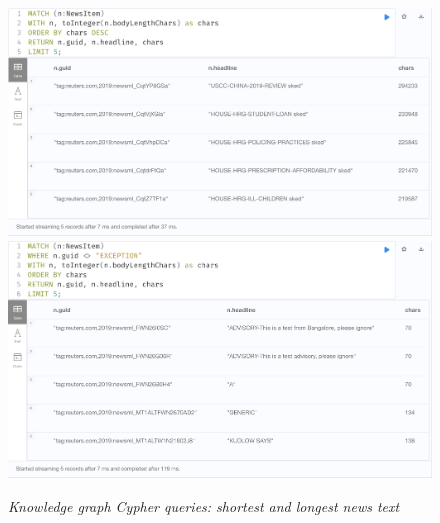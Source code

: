 \documentclass[11pt]{article}
\begin{document}
\begin{figure}
  \includegraphics[scale=0.2]{01-longest-items}
  \includegraphics[scale=0.2]{01-shortest-items}
  \caption{\textit{Knowledge graph Cypher queries: shortest and longest news text}}
\end{figure}
\end{document}

